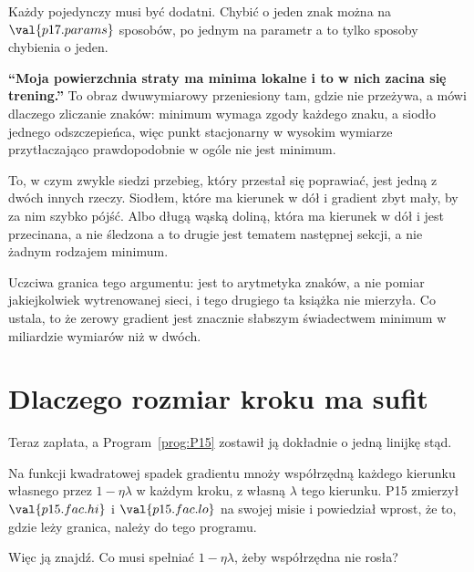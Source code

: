 \begin{fr}
\begin{ansblock}
Każdy pojedynczy musi być dodatni. Chybić o jeden znak można na
$\val{p17.params}$ sposobów, po jednym na parametr \dash{} a to tylko
sposoby chybienia o jeden.
\end{ansblock}

\begin{trapbox}
\textbf{\enquote{Moja powierzchnia straty ma minima lokalne i to w nich
zacina się trening.}} To obraz dwuwymiarowy przeniesiony tam, gdzie nie
przeżywa, a mówi dlaczego zliczanie znaków: minimum wymaga zgody każdego
znaku, a siodło jednego odszczepieńca, więc punkt stacjonarny w wysokim wymiarze
przytłaczająco prawdopodobnie w ogóle nie jest minimum.

To, w czym zwykle siedzi przebieg, który przestał się poprawiać, jest jedną z
dwóch innych rzeczy. Siodłem, które ma kierunek w dół i gradient zbyt mały, by
za nim szybko pójść. Albo długą wąską doliną, która ma kierunek w dół i jest
przecinana, a nie śledzona \dash{} a to drugie jest tematem następnej sekcji,
a nie żadnym rodzajem minimum.

Uczciwa granica tego argumentu: jest to arytmetyka znaków, a nie pomiar
jakiejkolwiek wytrenowanej sieci, i tego drugiego ta książka nie mierzyła. Co
ustala, to że zerowy gradient jest znacznie słabszym świadectwem minimum w
miliardzie wymiarów niż w dwóch.
\end{trapbox}
\end{fr}

\section{Dlaczego rozmiar kroku ma sufit}
\label{sec:P17-stepsize}

\begin{fr}
Teraz zapłata, a Program~\ref{prog:P15} zostawił ją dokładnie o jedną linijkę
stąd.

Na funkcji kwadratowej spadek gradientu mnoży współrzędną każdego kierunku
własnego przez $1 - \eta\lambda$ w każdym kroku, z własną $\lambda$ tego
kierunku. P15 zmierzył $\val{p15.fac.hi}$ i
$\val{p15.fac.lo}$ na swojej misie i powiedział wprost, że to, gdzie leży
granica, należy do tego programu.

Więc ją znajdź. Co musi spełniać $1 - \eta\lambda$, żeby współrzędna nie
rosła?
\dotline
\nextframe
\end{fr}

